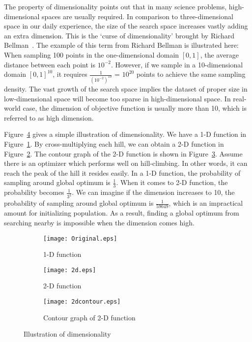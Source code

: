 The property of dimensionality points out that in many science problems,
high-dimensional spaces are usually required.
In comparison to three-dimensional space in our daily experience, the
size of the search space increases vastly adding an extra dimension.
This is the `curse of dimensionality’ brought by Richard
  Bellman~\cite{bellman1956dynamic}.
The example of this term from Richard Bellman is illustrated here:
When sampling 100 points in the one-dimensional domain $[0,1]$, the
average distance between each point is $10^{-2}$.
However, if we sample in a 10-dimensional domain $[ 0 , 1 ]^{10}$, it
requires $\frac{1}{(10^{-2})^{10}}$ = $10^{20}$ points to achieve the
same sampling density.
The vast growth of the search space implies the dataset of proper size
in low-dimensional space will become too sparse in high-dimensional
space.
In real-world case, the dimension of objective function is usually more
than 10, which is referred to as high dimension.

Figure~\ref{fig:dimensionality} gives a simple illustration of
dimensionality.
We have a 1-D function in Figure~\ref{fig:1d}.
By cross-multiplying each hill, we can obtain a 2-D function in
Figure~\ref{fig:2d}.
The contour graph of the 2-D function is shown in
Figure~\ref{fig:2dc}.
Assume there is an optimizer which performs well on hill-climbing.
In other words, it can reach the peak of the hill it resides easily.
In a 1-D function, the probability of sampling around global optimum is
$\frac{1}{3}$.
When it comes to 2-D function, the probability becomes $\frac{1}{3^2}$.
We can imagine if the dimension increases  to 10, the probability of
sampling around global optimum is $\frac{1}{59049}$, which is an
impractical amount for initializing population.
As a result, finding a global optimum from searching nearby is
impossible when the dimension comes high.

\begin{figure}[h]
  \centering
  \begin{subfigure}{.45\textwidth}
  \centering
  \texttt{[image: Original.eps]}
  \caption{1-D function}  
  \label{fig:1d}
\end{subfigure}
\begin{subfigure}{.45\textwidth}
  \centering
  \texttt{[image: 2d.eps]}
  \caption{2-D function}
  \label{fig:2d}
\end{subfigure}
\begin{subfigure}{.3\textwidth}
  \centering
  \texttt{[image: 2dcontour.eps]}
  \caption{Contour graph of 2-D function}
  \label{fig:2dc}
\end{subfigure}
  \caption{Illustration of dimensionality}
  \label{fig:dimensionality}
\end{figure}

